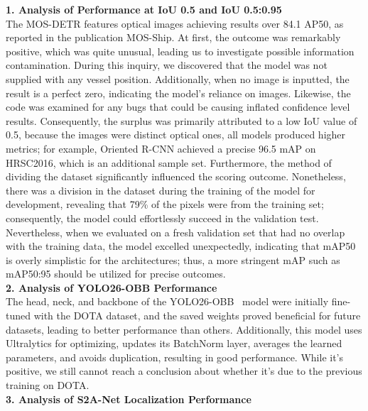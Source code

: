 \label{sec:analysis_of_design_solutions}
\noindent\textbf{1. Analysis of Performance at IoU 0.5 and IoU 0.5:0.95}\\
The MOS-DETR features optical images achieving results over 84.1 AP50, as reported in the publication MOS-Ship\cite{you2026multi}. At first, the outcome was remarkably positive, which was quite unusual, leading us to investigate possible information contamination. During this inquiry, we discovered that the model was not supplied with any vessel position. Additionally, when no image is inputted, the result is a perfect zero, indicating the model's reliance on images. Likewise, the code was examined for any bugs that could be causing inflated confidence level results. Consequently, the surplus was primarily attributed to a low IoU value of 0.5, because the images were distinct optical ones, all models produced higher metrics; for example, Oriented R-CNN\cite{xie2021oriented} achieved a precise 96.5 mAP on HRSC2016, which is an additional sample set. Furthermore, the method of dividing the dataset significantly influenced the scoring outcome. Nonetheless, there was a division in the dataset during the training of the model for development, revealing that 79\% of the pixels were from the training set; consequently, the model could effortlessly succeed in the validation test. Nevertheless, when we evaluated on a fresh validation set that had no overlap with the training data, the model excelled unexpectedly, indicating that mAP50 is overly simplistic for the architectures; thus, a more stringent mAP such as mAP50:95 should be utilized for precise outcomes.\\

\noindent\textbf{2. Analysis of YOLO26-OBB Performance}\\
The head, neck, and backbone of the YOLO26-OBB~\cite{jocher2026ultralytics} model were initially fine-tuned with the DOTA\cite{xia2018dota} dataset, and the saved weights proved beneficial for future datasets, leading to better performance than others. Additionally, this model uses Ultralytics for optimizing, updates its BatchNorm layer, averages the learned parameters, and avoids duplication, resulting in good performance. While it's positive, we still cannot reach a conclusion about whether it's due to the previous training on DOTA\cite{xia2018dota}.\\

\noindent\textbf{3. Analysis of S2A-Net Localization Performance}\\

